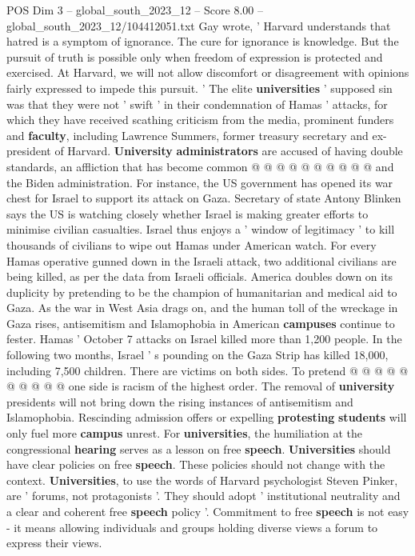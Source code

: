 \begin{textsample}{POS Dim 3 – global\_south\_2023\_12 – Score 8.00 – global\_south\_2023\_12/104412051.txt}
Gay wrote, ' Harvard understands that hatred is a symptom of ignorance.
The cure for ignorance is knowledge.
But the pursuit of truth is possible only when freedom of expression is protected and exercised.
At Harvard, we will not allow discomfort or disagreement with opinions fairly expressed to impede this pursuit. ' The elite \textbf{universities} ' supposed sin was that they were not ' swift ' in their condemnation of Hamas ' attacks, for which they have received scathing criticism from the media, prominent funders and \textbf{faculty}, including Lawrence Summers, former treasury secretary and ex-president of Harvard. \textbf{University} \textbf{administrators} are accused of having double standards, an affliction that has become common @ @ @ @ @ @ @ @ @ @ and the Biden administration.
For instance, the US government has opened its war chest for Israel to support its attack on Gaza.
Secretary of state Antony Blinken says the US is watching closely whether Israel is making greater efforts to minimise civilian casualties.
Israel thus enjoys a ' window of legitimacy ' to kill thousands of civilians to wipe out Hamas under American watch.
For every Hamas operative gunned down in the Israeli attack, two additional civilians are being killed, as per the data from Israeli officials.
America doubles down on its duplicity by pretending to be the champion of humanitarian and medical aid to Gaza.
As the war in West Asia drags on, and the human toll of the wreckage in Gaza rises, antisemitism and Islamophobia in American \textbf{campuses} continue to fester.
Hamas ' October 7 attacks on Israel killed more than 1,200 people.
In the following two months, Israel ' s pounding on the Gaza Strip has killed 18,000, including 7,500 children.
There are victims on both sides.
To pretend @ @ @ @ @ @ @ @ @ @ one side is racism of the highest order.
The removal of \textbf{university} presidents will not bring down the rising instances of antisemitism and Islamophobia.
Rescinding admission offers or expelling \textbf{protesting} \textbf{students} will only fuel more \textbf{campus} unrest.
For \textbf{universities}, the humiliation at the congressional \textbf{hearing} serves as a lesson on free \textbf{speech}. \textbf{Universities} should have clear policies on free \textbf{speech}.
These policies should not change with the context. \textbf{Universities}, to use the words of Harvard psychologist Steven Pinker, are ' forums, not protagonists '.
They should adopt ' institutional neutrality and a clear and coherent free \textbf{speech} policy '.
Commitment to free \textbf{speech} is not easy - it means allowing individuals and groups holding diverse views a forum to express their views.

\end{textsample}
